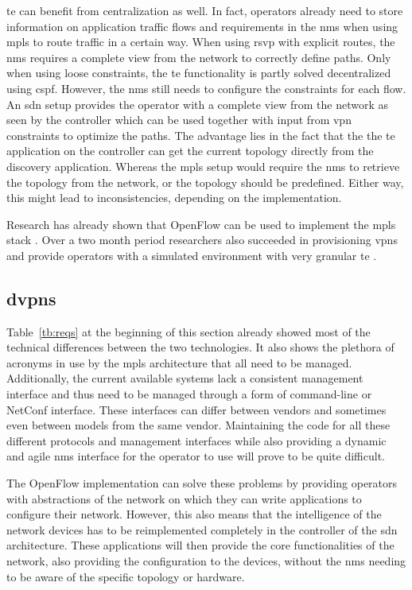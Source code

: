 \acl{te} can benefit from centralization as well. In fact, operators already need to store information on application traffic flows and requirements in the \ac{nms} when using \ac{mpls} to route traffic in a certain way. When using \ac{rsvp} with explicit routes, the \ac{nms} requires a complete view from the network to correctly define paths. Only when using loose constraints, the \ac{te} functionality is partly solved decentralized using \ac{cspf}. However, the \ac{nms} still needs to configure the constraints for each flow. An \ac{sdn} setup provides the operator with a complete view from the network as seen by the controller which can be used together with input from \ac{vpn} constraints to optimize the paths. The advantage lies in the fact that the the \ac{te} application on the controller can get the current topology directly from the discovery application. Whereas the \ac{mpls} setup would require the \ac{nms} to retrieve the topology from the network, or the topology should be predefined. Either way, this might lead to inconsistencies, depending on the implementation.

Research has already shown that OpenFlow can be used to implement the \ac{mpls} stack \cite{mpls-open}. Over a two month period researchers also succeeded in provisioning \acp{vpn} and provide operators with a simulated environment with very granular \ac{te} \cite{mpls-vpn-openflow}.


\subsection{\acp{dvpn}} %
\label{sub:dvpn}

Table~\ref{tb:reqs} at the beginning of this section already showed most of the technical differences between the two technologies. It also shows the plethora of acronyms in use by the \ac{mpls} architecture that all need to be managed. Additionally, the current available systems lack a consistent management interface and thus need to be managed through a form of command-line or NetConf interface. These interfaces can differ between vendors and sometimes even between models from the same vendor. Maintaining the code for all these different protocols and management interfaces while also providing a dynamic and agile \ac{nms} interface for the operator to use will prove to be quite difficult.

The OpenFlow implementation can solve these problems by providing operators with abstractions of the network on which they can write applications to configure their network. However, this also means that the intelligence of the network devices has to be reimplemented completely in the controller of the \ac{sdn} architecture. These applications will then provide the core functionalities of the network, also providing the configuration to the devices, without the \ac{nms} needing to be aware of the specific topology or hardware. 

